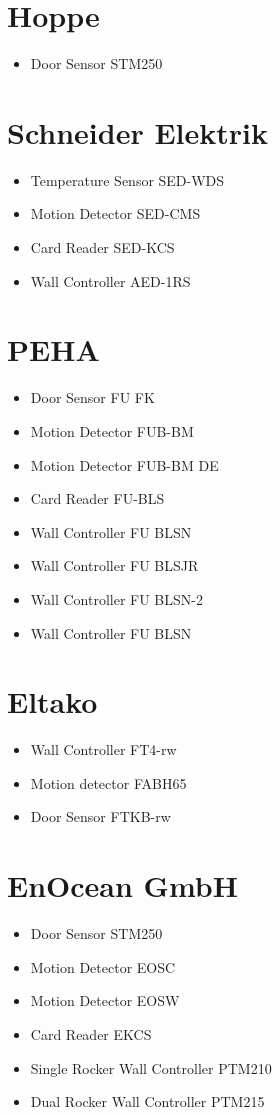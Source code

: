 \section{Hoppe}
\begin{itemize}
\item Door Sensor STM250
\end{itemize}
\section{Schneider Elektrik}
\begin{itemize}
\item Temperature Sensor SED-WDS
\item Motion Detector SED-CMS
\item Card Reader SED-KCS
\item Wall Controller AED-1RS
\end{itemize}
\section{PEHA}
\begin{itemize}
\item Door Sensor FU FK
\item Motion Detector FUB-BM
\item Motion Detector FUB-BM DE
\item Card Reader FU-BLS
\item Wall Controller FU BLSN
\item Wall Controller FU BLSJR
\item Wall Controller FU BLSN-2
\item Wall Controller FU BLSN
\end{itemize}
\section{Eltako}
\begin{itemize}
\item Wall Controller FT4-rw
\item Motion detector FABH65
\item Door Sensor FTKB-rw
\end{itemize}

\section{EnOcean GmbH}
\begin{itemize}
\item Door Sensor STM250
\item Motion Detector EOSC
\item Motion Detector EOSW
\item Card Reader EKCS
\item Single Rocker Wall Controller PTM210
\item Dual Rocker Wall Controller PTM215
\end{itemize}
